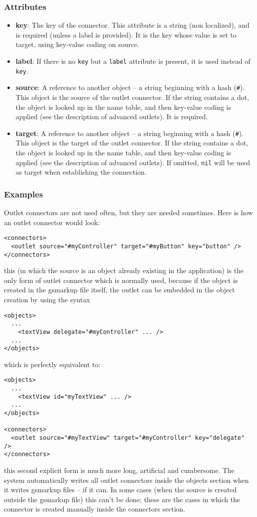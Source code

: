 \subsubsection{Attributes}
\begin{itemize}
\item {\bf key}: The key of the connector.  This attribute is a string
  (non localized), and is required (unless a label is provided).  It
  is the key whose value is set to target, using key-value coding on
  source.
\item {\bf label}: If there is no \texttt{key} but a \texttt{label}
  attribute is present, it is used instead of \texttt{key}.
\item {\bf source}: A reference to another object -- a string
  beginning with a hash (\texttt{\#}).  This object is the source of
  the outlet connector.  If the string contains a dot, the object is
  looked up in the name table, and then key-value coding is applied
  (see the description of advanced outlets).  It is required.
\item {\bf target}: A reference to another object -- a string
  beginning with a hash (\texttt{\#}).  This object is the target of
  the outlet connector.  If the string contains a dot, the object is
  looked up in the name table, and then key-value coding is applied
  (see the description of advanced outlets).  If omitted, \texttt{nil}
  will be used as target when establishing the connection.
\end{itemize}

\subsubsection{Examples}
Outlet connectors are not used often, but they are needed sometimes.
Here is how an outlet connector would look:
\begin{verbatim}
<connectors>
  <outlet source="#myController" target="#myButton" key="button" />
</connectors>
\end{verbatim}
this (in which the source is an object already existing in the
application) is the only form of outlet connector which is normally
used, because if the object is created in the gsmarkup file itself, the outlet
can be embedded in the object creation by using the syntax
\begin{verbatim}
<objects>
  ...
    <textView delegate="#myController" ... />
  ...
</objects>
\end{verbatim}
which is perfectly equivalent to:
\begin{verbatim}
<objects>
  ...
    <textView id="myTextView" ... />
  ...
</objects>

<connectors>
  <outlet source="#myTextView" target="#myController" key="delegate" />
</connectors>
\end{verbatim}
this second explicit form is much more long, artificial and
cumbersome.  The system automatically writes all outlet connectors
inside the objects section when it writes gsmarkup files -- if it can.  In
some cases (when the source is created outside the gsmarkup file) this
can't be done; these are the cases in which the connector is created
manually inside the connectors section.


